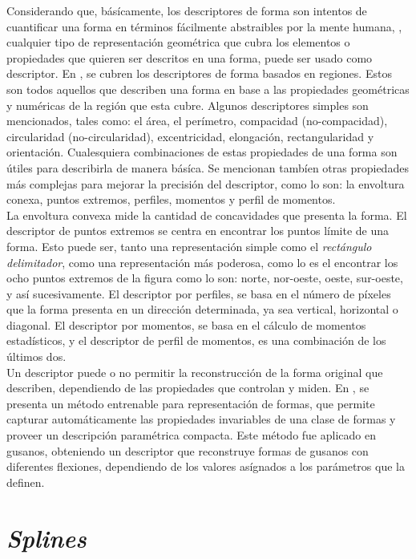 Considerando que, b\'as\'icamente, los descriptores de forma son intentos de cuantificar
una forma en t\'erminos f\'acilmente abstraibles por la mente humana, \cite[p.1]{desclecture},
cualquier tipo de representaci\'on geom\'etrica que cubra los elementos o propiedades que
quieren ser descritos en una forma, puede ser usado como descriptor. En \cite{desclecture},
se cubren los descriptores de forma basados en regiones. Estos son todos aquellos que describen
una forma en base a las propiedades geom\'etricas y num\'ericas de la regi\'on que esta cubre.
Algunos descriptores simples son mencionados, tales como: el \'area, el per\'imetro,
compacidad (no-compacidad), circularidad (no-circularidad), excentricidad, elongaci\'on,
rectangularidad y orientaci\'on. Cualesquiera combinaciones de estas propiedades de una forma
son \'utiles para describirla de manera b\'as\'ica. Se mencionan tamb\'ien otras propiedades
m\'as complejas para mejorar la precisi\'on del descriptor, como lo son: la envoltura conexa, 
puntos extremos, perfiles, momentos y perfil de momentos.\\
La envoltura convexa mide la cantidad de concavidades que presenta la forma.
El descriptor de puntos extremos se centra en encontrar los puntos l\'imite de una forma. Esto puede ser, 
tanto una representaci\'on simple como el \emph{rect\'angulo delimitador}, como una
representaci\'on m\'as poderosa, como lo es el encontrar los ocho puntos extremos de la figura
como lo son: norte, nor-oeste, oeste, sur-oeste, y as\'i sucesivamente. El descriptor por
perfiles, se basa en el n\'umero de p\'ixeles que la forma presenta en un direcci\'on determinada,
ya sea vertical, horizontal o diagonal. El descriptor por momentos, se basa en el c\'alculo
de momentos estad\'isticos, y el descriptor de perfil de momentos, es una combinaci\'on de
los \'ultimos dos.\\


Un descriptor puede o no permitir la reconstrucci\'on de la forma original que
describen, dependiendo de las propiedades que controlan y miden.
En \cite{wormparam}, se presenta un m\'etodo entrenable para representaci\'on
de formas, que permite capturar autom\'aticamente las propiedades invariables
de una clase de formas y proveer un descripci\'on param\'etrica compacta. Este
m\'etodo fue aplicado en gusanos, obteniendo un descriptor que reconstruye
formas de gusanos con diferentes flexiones, dependiendo de los valores
as\'ignados a los par\'ametros que la definen.

\section{\emph{Splines}}
\label{sec:splines}

